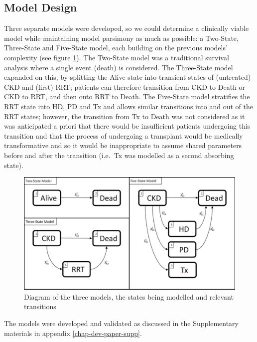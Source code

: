 \documentclass[12pt,PhD,twoside,openright]{muthesis}
\begin{document}
\hypertarget{model-design}{%
\subsection{Model Design}\label{model-design}}

Three separate models were developed, so we could determine a clinically viable model while maintaining model parsimony as much as possible: a Two-State, Three-State and Five-State model, each building on the previous models' complexity (see figure \ref{fig:State-Diagram}). The Two-State model was a traditional survival analysis where a single event (death) is considered. The Three-State model expanded on this, by splitting the Alive state into transient states of (untreated) CKD and (first) RRT; patients can therefore transition from CKD to Death or CKD to RRT, and then onto RRT to Death. The Five-State model stratifies the RRT state into HD, PD and Tx and allows similar transitions into and out of the RRT states; however, the transition from Tx to Death was not considered as it was anticipated a priori that there would be insufficient patients undergoing this transition and that the process of undergoing a transplant would be medically transformative and so it would be inappropriate to assume shared parameters before and after the transition (i.e.~Tx was modelled as a second absorbing state).
\begin{figure}

{\centering \includegraphics[width=0.9\linewidth]{figure/Dev_Paper_State_Diagrams} 

}

\caption{Diagram of the three models, the states being modelled and relevant transitions}\label{fig:State-Diagram}
\end{figure}
The models were developed and validated as discussed in the Supplementary materials in appendix \ref{chap-dev-paper-supp}.
\end{document}
